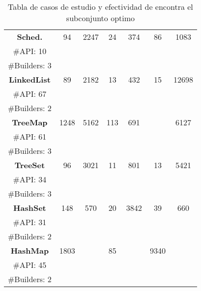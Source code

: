 \begin{table}[H]
\begin{tabular}{|c c|cc|cc|cc|}
\midrule
\multicolumn{2}{|c|}{\textbf{Sched.}} &   94& 2247  & 24  & 374  & 86  &1083    \\
\multicolumn{2}{|c|}{\tiny \#API: 10} &  &   & &   & & \\
\multicolumn{2}{|c|}{\tiny \#Builders: 3} &  &   & &   & & \\
\midrule
\multicolumn{2}{|c|}{\textbf{LinkedList}} & 89 &  2182 &  13 &  432 & 15 &  12698  \\
\multicolumn{2}{|c|}{\tiny \#API: 67} &  &   & &   & & \\
\multicolumn{2}{|c|}{\tiny \#Builders: 2} &  &   & &   & & \\
\midrule
\multicolumn{2}{|c|}{\textbf{TreeMap}} & 1248  &  5162 &  113 & 691  &   &   6127  \\
\multicolumn{2}{|c|}{\tiny \#API: 61} &  &   & &   & & \\
\multicolumn{2}{|c|}{\tiny \#Builders: 3} &  &   & &   & & \\
\midrule
\multicolumn{2}{|c|}{\textbf{TreeSet}} &  96 & 3021  &  11 & 801  &  13 &  5421  \\
\multicolumn{2}{|c|}{\tiny \#API: 34} &  &   & &   & & \\
\multicolumn{2}{|c|}{\tiny \#Builders: 3} &  &   & &   & & \\
\midrule
\multicolumn{2}{|c|}{\textbf{HashSet}} &  148 &  570 & 20  &  3842 &  39 &   660 \\
\multicolumn{2}{|c|}{\tiny \#API: 31} &  &   & &   & & \\
\multicolumn{2}{|c|}{\tiny \#Builders: 2} &  &   & &   & & \\
\midrule
\multicolumn{2}{|c|}{\textbf{HashMap}} &  1803 &   &  85 &   &   9340&    \\
\multicolumn{2}{|c|}{\tiny \#API: 45} &  &   & &   & & \\
\multicolumn{2}{|c|}{\tiny \#Builders: 2} &  &   & &   & & \\
\hline
\end{tabular}

\caption{Tabla de casos de estudio y efectividad de encontra el subconjunto optimo}
\label{tab:eficiencia}
\end{table}

